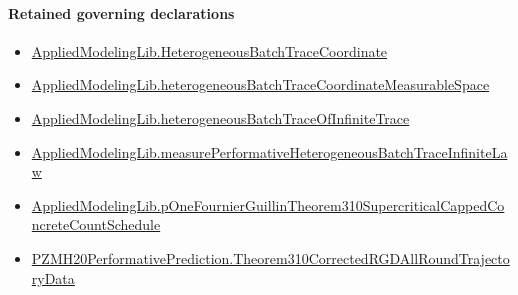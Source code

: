 \documentclass[10pt]{article}
\begin{document}
\paragraph{Retained governing declarations}
\begin{itemize}\raggedright
\item \hyperlink{governing-declaration-37d7ae049de215a7}{Applied\allowbreak{}Modeling\allowbreak{}Lib.\allowbreak{}Heterogeneous\allowbreak{}Batch\allowbreak{}Trace\allowbreak{}Coordinate}
\item \hyperlink{governing-declaration-92d1582063c434f3}{Applied\allowbreak{}Modeling\allowbreak{}Lib.\allowbreak{}heterogeneous\allowbreak{}Batch\allowbreak{}Trace\allowbreak{}Coordinate\allowbreak{}Measurable\allowbreak{}Space}
\item \hyperlink{governing-declaration-644c195e65179f85}{Applied\allowbreak{}Modeling\allowbreak{}Lib.\allowbreak{}heterogeneous\allowbreak{}Batch\allowbreak{}Trace\allowbreak{}Of\allowbreak{}Infinite\allowbreak{}Trace}
\item \hyperlink{governing-declaration-2833c0091dd3eed5}{Applied\allowbreak{}Modeling\allowbreak{}Lib.\allowbreak{}measure\allowbreak{}Performative\allowbreak{}Heterogeneous\allowbreak{}Batch\allowbreak{}Trace\allowbreak{}Infinite\allowbreak{}Law}
\item \hyperlink{governing-declaration-3cf6b14c7bcca80c}{Applied\allowbreak{}Modeling\allowbreak{}Lib.\allowbreak{}p\allowbreak{}One\allowbreak{}Fournier\allowbreak{}Guillin\allowbreak{}Theorem310\allowbreak{}Supercritical\allowbreak{}Capped\allowbreak{}Concrete\allowbreak{}Count\allowbreak{}Schedule}
\item \hyperlink{paper-prerequisite-5a443fd08b184a8b}{PZMH20\allowbreak{}Performative\allowbreak{}Prediction.\allowbreak{}Theorem310\allowbreak{}Corrected\allowbreak{}RGD\allowbreak{}All\allowbreak{}Round\allowbreak{}Trajectory\allowbreak{}Data}
\end{itemize}
\end{document}
